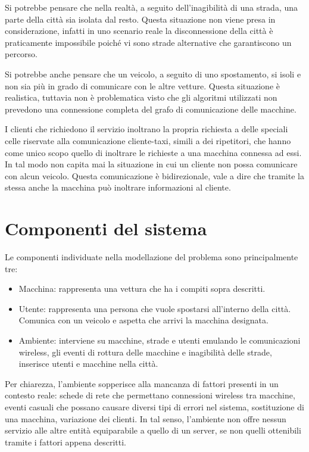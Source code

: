 Si potrebbe pensare che nella realtà, a seguito dell'inagibilità di una strada, una parte della città sia isolata dal resto. Questa situazione non viene presa in considerazione, infatti in uno scenario reale la disconnessione della città è praticamente impossibile poiché vi sono strade alternative che garantiscono un percorso.

Si potrebbe anche pensare che un veicolo, a seguito di uno spostamento, si isoli e non sia più in grado di comunicare con le altre vetture. Questa situazione è realistica, tuttavia non è problematica visto che gli algoritmi utilizzati non prevedono una connessione completa del grafo di comunicazione delle macchine.

I clienti che richiedono il servizio inoltrano la propria richiesta a delle speciali celle riservate alla comunicazione cliente-taxi, simili a dei ripetitori, che hanno come unico scopo quello di inoltrare le richieste a una macchina connessa ad essi. In tal modo non capita mai la situazione in cui un cliente non possa comunicare con alcun veicolo. Questa comunicazione è bidirezionale, vale a dire che tramite la stessa anche la macchina può inoltrare informazioni al cliente.

\section{Componenti del sistema}

Le componenti individuate nella modellazione del problema sono principalmente tre:

\begin{itemize}
	\item Macchina: rappresenta una vettura che ha i compiti sopra descritti.
	\item Utente: rappresenta una persona che vuole spostarsi all'interno della città. Comunica con un veicolo e aspetta che arrivi la macchina designata.
	\item Ambiente: interviene su macchine, strade e utenti emulando le comunicazioni wireless, gli eventi di rottura delle macchine e inagibilità delle strade, inserisce utenti e macchine nella città.
\end{itemize}

Per chiarezza, l'ambiente sopperisce alla mancanza di fattori presenti in un contesto reale: schede di rete che permettano connessioni wireless tra macchine, eventi casuali che possano causare diversi tipi di errori nel sistema, sostituzione di una macchina, variazione dei clienti. In tal senso, l'ambiente non offre nessun servizio alle altre entità equiparabile a quello di un server, se non quelli ottenibili tramite i fattori appena descritti.

